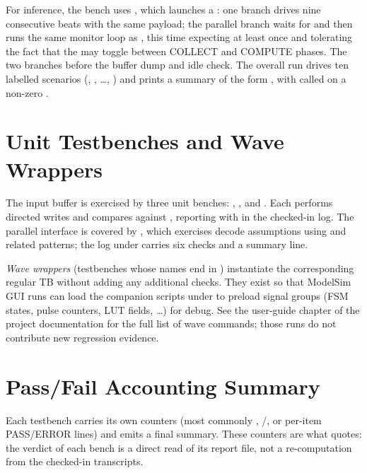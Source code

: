 For inference, the bench uses , which launches a
: one branch drives nine consecutive  beats with
the same payload; the parallel branch waits for  and then
runs the same monitor loop as , this time expecting
 at least once and tolerating the fact that the
 may toggle between COLLECT and COMPUTE
phases. The two branches  before the buffer dump and idle
check. The overall run drives ten labelled scenarios (,
, \ldots, ) and prints a summary of the form
, with  called on a
non-zero .

\section{Unit Testbenches and Wave Wrappers}
\label{sec:verif-unit}

The input buffer is exercised by three unit benches:
, ,
and . Each performs directed
writes and compares against , reporting with
 in the checked-in log.
The parallel interface is covered by
, which exercises decode
assumptions using  and related patterns;
the log under  carries six checks and a
summary line.

\emph{Wave wrappers} (testbenches whose names end in )
instantiate the corresponding regular TB without adding any additional
checks. They exist so that ModelSim GUI runs can load the companion
 scripts under  to preload signal groups
(FSM states, pulse counters, LUT fields, \ldots{})
for debug. See the user-guide chapter of the project documentation for
the full list of wave commands; those runs do not contribute new
regression evidence.

\section{Pass/Fail Accounting Summary}
\label{sec:verif-passfail}

Each testbench carries its own counters (most commonly ,
/, or per-item PASS/ERROR lines) and
emits a final summary. These counters are what 
quotes: the verdict of each bench is a direct read of its report file,
not a re-computation from the checked-in transcripts.
